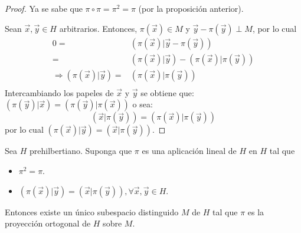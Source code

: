 \documentclass[12pt]{report}
\theoremstyle{largebreak}
\newcommand\pint[2]{\ensuremath{\left(#1\big| #2\right)}}
\begin{document}
\begin{proof}
        Ya se sabe que $\pi\circ\pi=\pi^2=\pi$ (por la proposición anterior).

        Sean $\vec{x},\vec{y}\in H$ arbitrarios. Entonces, $\pi(\vec{x})\in M$ y $\vec{y}-\pi(\vec{y})\perp M$, por lo cual
        \begin{equation*}
            \begin{split}
                0=&\pint{\pi(\vec{x})}{\vec{y}-\pi(\vec{y})} \\
                =&\pint{\pi(\vec{x})}{\vec{y}}-\pint{\pi(\vec{x})}{\pi(\vec{y})}\\
                \Rightarrow \pint{\pi(\vec{x})}{\vec{y}} =& \pint{\pi(\vec{x})}{\pi(\vec{y})}\\
            \end{split}
        \end{equation*}
        Intercambiando los papeles de $\vec{x}$ y $\vec{y}$ se obtiene que: $\pint{\pi(\vec{y})}{\vec{x}}=\pint{\pi(\vec{y})}{\pi(\vec{x})}$ o sea:
        \begin{equation*}
            \pint{\vec{x}}{\pi(\vec{y})}=\pint{\pi(\vec{x})}{\pi(\vec{y})}
        \end{equation*}
        por lo cual $\pint{\pi(\vec{x})}{\vec{y}}=\pint{\vec{x}}{\pi(\vec{y})}$.
    \end{proof}

    \begin{propo}
        Sea $H$ prehilbertiano. Suponga que $\pi$ es una aplicación lineal de $H$ en $H$ tal que
        \begin{itemize}
            \item $\pi^2=\pi$.
            \item $\pint{\pi(\vec{x})}{\vec{y}}=\pint{\vec{x}}{\pi(\vec{y})},\forall\vec{x},\vec{y}\in H$.
        \end{itemize}
        Entonces existe un único subespacio distinguido $M$ de $H$ tal que $\pi$ es la proyección ortogonal de $H$ sobre $M$.
    \end{propo}
\end{document}
